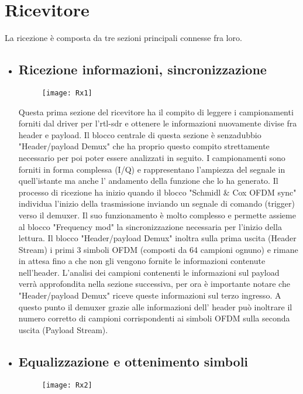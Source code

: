  \section{Ricevitore}
 La ricezione è composta da tre sezioni principali connesse fra loro.
 \begin{itemize}
 	\item \subsection{Ricezione informazioni, sincronizzazione}
 	\begin{figure}[h]
 		\centering
 		\texttt{[image: Rx1]}
 		\caption{}
 	\end{figure}
 Questa prima sezione del ricevitore ha il compito di leggere i campionamenti forniti dal driver per l'rtl-sdr e ottenere le informazioni nuovamente divise fra header e payload. Il blocco centrale di questa sezione è senzadubbio "Header/payload Demux" che ha proprio questo compito strettamente necessario per poi poter essere analizzati in seguito. I campionamenti sono forniti in forma complessa (I/Q) e rappresentano l'ampiezza del segnale in quell'istante ma anche l' andamento della funzione che lo ha generato. Il processo di ricezione ha inizio quando il blocco "Schmidl \& Cox OFDM sync" individua l'inizio della trasmissione inviando un segnale di comando (trigger) verso il demuxer. Il suo funzionamento è molto complesso e permette assieme al blocco "Frequency mod" la sincronizzazione necessaria per l'inizio della lettura. Il blocco "Header/payload Demux" inoltra sulla prima uscita (Header Stream) i primi 3 simboli OFDM (composti da 64 campioni ognuno) e rimane in attesa fino a che non gli vengono fornite le informazioni contenute nell'header. L'analisi dei campioni contenenti le informazioni sul payload verrà approfondita nella sezione successiva, per ora è importante notare che "Header/payload Demux" riceve queste informazioni sul terzo ingresso. A questo punto il demuxer grazie alle informazioni dell' header può inoltrare il numero corretto di campioni corrispondenti ai simboli OFDM sulla seconda uscita (Payload Stream).
 	\item \subsection{Equalizzazione e ottenimento simboli}
 	\begin{figure}[h]
 		\centering
 		\texttt{[image: Rx2]}
 		\caption{}
 	\end{figure}

\end{itemize}
